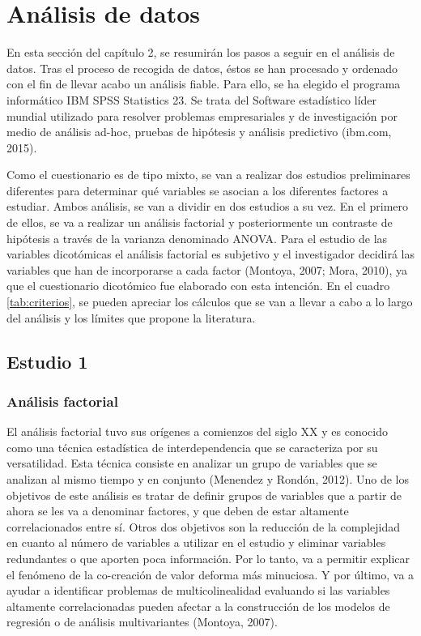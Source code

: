 \section{Análisis de datos}

En esta sección del capítulo 2, se resumirán los pasos a seguir en el análisis de datos. Tras el proceso de recogida de datos, éstos se han procesado y ordenado con el fin de llevar acabo un análisis fiable. Para ello, se ha elegido el programa informático IBM SPSS Statistics 23. Se trata del Software estadístico líder mundial utilizado para resolver problemas empresariales y de investigación por medio de análisis ad-hoc, pruebas de hipótesis y análisis predictivo (ibm.com, 2015).

Como el cuestionario es de tipo mixto, se van a realizar dos estudios preliminares diferentes para determinar qué variables se asocian a los diferentes factores a estudiar. Ambos análisis, se van a dividir en dos estudios a su vez. En el primero de ellos, se va a realizar un análisis factorial y posteriormente un contraste de hipótesis a través de la varianza denominado ANOVA. Para el estudio de las variables dicotómicas el análisis factorial es subjetivo y el investigador decidirá las variables que han de incorporarse a cada factor (Montoya, 2007; Mora, 2010), ya que el cuestionario dicotómico fue elaborado con esta intención. En el cuadro \ref{tab:criterios}, se pueden apreciar los cálculos que se van a llevar a cabo a lo largo del análisis y los límites que propone la literatura.



\subsection{Estudio 1}

\subsubsection{Análisis factorial}

El análisis factorial tuvo sus orígenes a comienzos del siglo XX y es conocido como una técnica estadística de interdependencia que se caracteriza por su versatilidad. Esta técnica consiste en analizar un grupo de variables que se analizan al mismo tiempo y en conjunto (Menendez y Rondón, 2012). Uno de los objetivos de este análisis es tratar de definir grupos de variables que a partir de ahora se les va a denominar factores, y que deben de estar altamente correlacionados entre sí. Otros dos objetivos son la reducción de la complejidad en cuanto al número de variables a utilizar en el estudio y eliminar variables redundantes o que aporten poca información. Por lo tanto, va a permitir explicar el fenómeno de la co-creación de valor deforma más minuciosa. Y por último, va a ayudar a identificar problemas de multicolinealidad evaluando si las variables altamente correlacionadas pueden afectar a la construcción de los modelos de regresión o de análisis multivariantes (Montoya, 2007).

